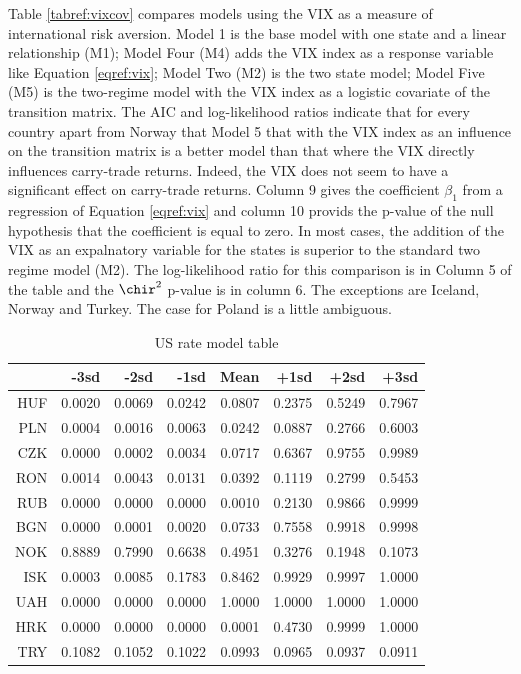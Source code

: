 \documentclass[12pt, a4paper, oneside]{article} %
\begin{document}
Table \ref{tabref:vixcov} compares models using the VIX as a measure of international risk aversion.   Model 1 is the base model with one state and a linear relationship (M1); Model Four (M4) adds the VIX index as a response variable like Equation \ref{eqref:vix}; Model Two (M2) is the two state model; Model Five (M5) is the two-regime model with the VIX index as a logistic covariate of the transition matrix.  The AIC and log-likelihood ratios indicate that for every country apart from Norway that Model 5 that with the VIX index as an influence on the transition matrix is a better model than that where the VIX directly influences carry-trade returns.  Indeed, the VIX does not seem to have a significant effect on carry-trade returns.  Column 9 gives the coefficient $\beta_1$ from a regression of Equation \ref{eqref:vix} and column 10 provids the p-value of the null hypothesis that the coefficient is equal to zero. In most cases, the addition of the VIX as an expalnatory variable for the states is superior to the standard two regime model (M2).  The log-likelihood ratio for this comparison is in Column 5 of the table and the $\chir^2$ p-value is in column 6.  The exceptions are Iceland, Norway and Turkey.  The case for Poland is a little ambiguous. 




\begin{landscape}
\begin{table}[ht]
\centering
\begin{tabular}{rrrrrrrr}
  \hline
 & -3sd & -2sd & -1sd & Mean & +1sd & +2sd & +3sd \\ 
  \hline
HUF & 0.0020 & 0.0069 & 0.0242 & 0.0807 & 0.2375 & 0.5249 & 0.7967 \\ 
  PLN & 0.0004 & 0.0016 & 0.0063 & 0.0242 & 0.0887 & 0.2766 & 0.6003 \\ 
  CZK & 0.0000 & 0.0002 & 0.0034 & 0.0717 & 0.6367 & 0.9755 & 0.9989 \\ 
  RON & 0.0014 & 0.0043 & 0.0131 & 0.0392 & 0.1119 & 0.2799 & 0.5453 \\ 
  RUB & 0.0000 & 0.0000 & 0.0000 & 0.0010 & 0.2130 & 0.9866 & 0.9999 \\ 
  BGN & 0.0000 & 0.0001 & 0.0020 & 0.0733 & 0.7558 & 0.9918 & 0.9998 \\ 
  NOK & 0.8889 & 0.7990 & 0.6638 & 0.4951 & 0.3276 & 0.1948 & 0.1073 \\ 
  ISK & 0.0003 & 0.0085 & 0.1783 & 0.8462 & 0.9929 & 0.9997 & 1.0000 \\ 
  UAH & 0.0000 & 0.0000 & 0.0000 & 1.0000 & 1.0000 & 1.0000 & 1.0000 \\ 
  HRK & 0.0000 & 0.0000 & 0.0000 & 0.0001 & 0.4730 & 0.9999 & 1.0000 \\ 
  TRY & 0.1082 & 0.1052 & 0.1022 & 0.0993 & 0.0965 & 0.0937 & 0.0911 \\ 
   \hline
\end{tabular}
\caption{US rate model table} 
\label{tabref:comptab}
\end{table}
\end{landscape}
\end{document}
